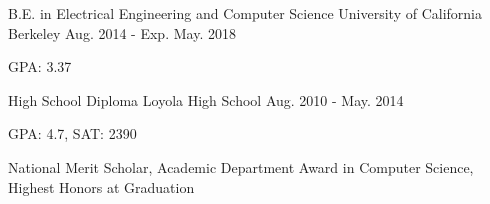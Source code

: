 \vspace{-5mm}
\vspace{-2mm}

\begin{cventries}

  \cventry
    {B.E. in Electrical Engineering and Computer Science} %
    {University of California Berkeley} %
    {Aug. 2014 - Exp. May. 2018} %
    {} %
    {
      \begin{cvitems} %
        \item GPA: 3.37
      \end{cvitems}
    }
      \cventry
    {High School Diploma} %
    {Loyola High School} %
    {Aug. 2010 -  May. 2014} %
    {} %
    {
      \begin{cvitems} %
        \item GPA: 4.7, SAT: 2390
        \item National Merit Scholar, Academic Department Award in Computer Science, Highest Honors at Graduation
      \end{cvitems}
    }

\end{cventries}
